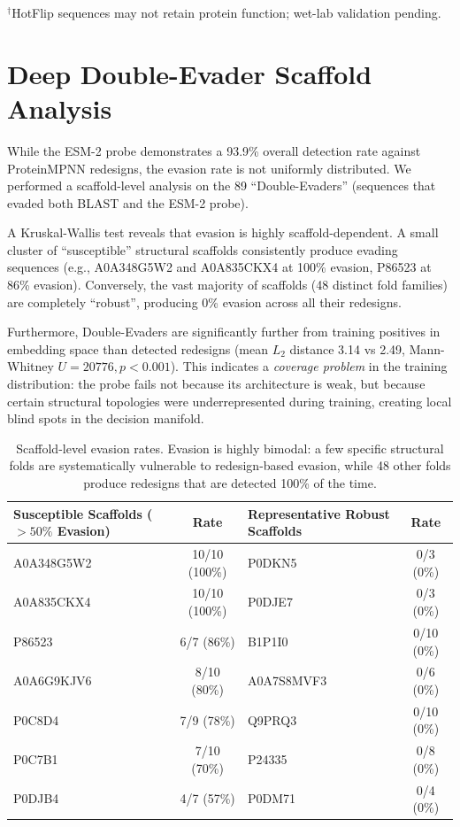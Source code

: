 \documentclass[11pt,a4paper]{article}
\begin{document}
\noindent $^\dagger$HotFlip sequences may not retain protein function; wet-lab validation pending.

\section{Deep Double-Evader Scaffold Analysis}

While the ESM-2 probe demonstrates a 93.9\% overall detection rate against ProteinMPNN redesigns, the evasion rate is not uniformly distributed. We performed a scaffold-level analysis on the 89 ``Double-Evaders'' (sequences that evaded both BLAST and the ESM-2 probe). 

A Kruskal-Wallis test reveals that evasion is highly scaffold-dependent. A small cluster of ``susceptible'' structural scaffolds consistently produce evading sequences (e.g., A0A348G5W2 and A0A835CKX4 at 100\% evasion, P86523 at 86\% evasion). Conversely, the vast majority of scaffolds (48 distinct fold families) are completely ``robust'', producing 0\% evasion across all their redesigns. 

Furthermore, Double-Evaders are significantly further from training positives in embedding space than detected redesigns (mean $L_2$ distance 3.14 vs 2.49, Mann-Whitney $U=20776, p<0.001$). This indicates a \textit{coverage problem} in the training distribution: the probe fails not because its architecture is weak, but because certain structural topologies were underrepresented during training, creating local blind spots in the decision manifold.

\begin{table}[H]
\centering
\small
\begin{tabular}{lc|lc}
\toprule
\textbf{Susceptible Scaffolds ($>50\%$ Evasion)} & \textbf{Rate} & \textbf{Representative Robust Scaffolds} & \textbf{Rate} \\
\midrule
A0A348G5W2 & 10/10 (100\%) & P0DKN5 & 0/3 (0\%) \\
A0A835CKX4 & 10/10 (100\%) & P0DJE7 & 0/3 (0\%) \\
P86523 & 6/7 (86\%) & B1P1I0 & 0/10 (0\%) \\
A0A6G9KJV6 & 8/10 (80\%) & A0A7S8MVF3 & 0/6 (0\%) \\
P0C8D4 & 7/9 (78\%) & Q9PRQ3 & 0/10 (0\%) \\
P0C7B1 & 7/10 (70\%) & P24335 & 0/8 (0\%) \\
P0DJB4 & 4/7 (57\%) & P0DM71 & 0/4 (0\%) \\
\bottomrule
\end{tabular}
\caption{Scaffold-level evasion rates. Evasion is highly bimodal: a few specific structural folds are systematically vulnerable to redesign-based evasion, while 48 other folds produce redesigns that are detected 100\% of the time.}
\end{table}
\end{document}
